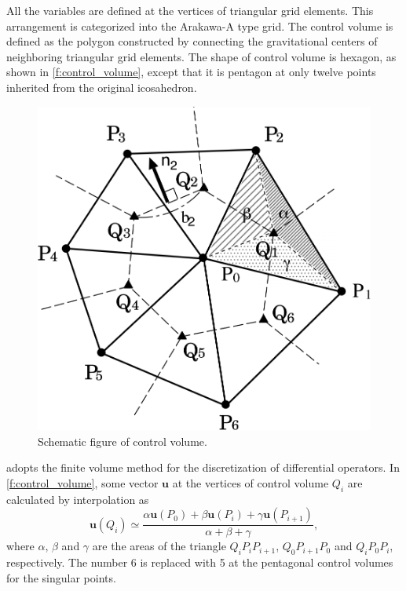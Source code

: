 All the variables are defined at the vertices of triangular grid
elements.
%
This arrangement is categorized into the Arakawa-A type grid.
%
The control volume is defined as the polygon constructed by connecting
the gravitational centers of neighboring triangular grid elements.
%
The shape of control volume is hexagon, as shown in
\autoref{f:control_volume}, except that it is pentagon at only twelve points
inherited from the original icosahedron.

\begin{figure}[tb]
 \centering
\includegraphics[scale=0.7]{figs/Tomita1-27-0.png}
 \caption{Schematic figure of control volume. \citep{Tomita:2008jc}}
 \label{f:control_volume}
\end{figure}


\NICAM adopts the finite volume method for the discretization of
differential operators.
%
In \autoref{f:control_volume}, some vector $\bm{u}$
at the vertices of control volume $Q_i$ are calculated by interpolation
as\footnotemark
%
%
\begin{equation}
 \bm{u} (Q_i) \simeq
 \frac{\alpha \bm{u}(P_0) + \beta \bm{u}(P_i) + \gamma \bm{u}(P_{i+1})}
      {\alpha + \beta + \gamma} ,\label{e:u_Q_i}
\end{equation}
%
where $\alpha$, $\beta$ and $\gamma$ are the areas of the triangle
$Q_i P_i P_{i+1}$, $Q_0 P_{i+1} P_0$ and $Q_i P_0 P_i$, respectively.
%
The number 6 is replaced with 5 at the pentagonal control volumes for
the singular points.

